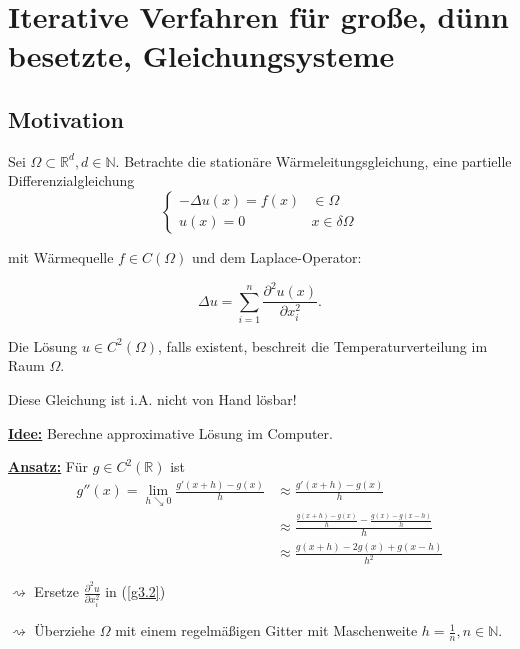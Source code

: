 \documentclass{book}
\def\R{\mathbb{R}}
\def\N{\mathbb{N}}
\begin{document}
    \chapter{Iterative Verfahren für große, dünn besetzte, Gleichungsysteme}

        \section{Motivation}

            Sei $\Omega\subset \R^d,d\in\N$. Betrachte die stationäre Wärmeleitungsgleichung, eine partielle Differenzialgleichung
            \begin{equation}\label{g3.1}
                \begin{cases}
                    -\Delta u(x)=f(x) & \in\Omega\\
                    u(x)=0 & x\in \delta\Omega
                \end{cases}
            \end{equation}

            mit Wärmequelle $f\in C(\Omega)$ und dem Laplace-Operator:

            \begin{equation}\label{g3.2}
                \Delta u =\sum_{i=1}^n \frac{\partial^2 u(x)}{\partial x_i^2}. 
            \end{equation}

            Die Lösung $u\in C^2(\Omega)$, falls existent, beschreit die Temperaturverteilung im Raum $\Omega$.

            Diese Gleichung ist i.A. nicht von Hand lösbar! 

            \underline{\textbf{Idee:}} Berechne approximative Lösung im Computer.

            \underline{\textbf{Ansatz:}} Für $g\in C^2(\R)$ ist
            \begin{align*}
                g''(x)=\lim_{h\searrow 0} \frac{g'(x+h)-g(x)}{h} &\approx \frac{g'(x+h)-g(x)}{h} \\
                & \approx \frac{\frac{g(x+h)-g(x)}{h}-\frac{g(x)-g(x-h)}{h}}{h}\\
                &\approx \frac{g(x+h)-2g(x)+g(x-h)}{h^2}
            \end{align*}

            $\rightsquigarrow$ Ersetze $\frac{\partial^2 u}{\partial x_i^2}$ in (\ref{g3.2})

            $\rightsquigarrow$ Überziehe $\Omega$ mit einem regelmäßigen Gitter mit Maschenweite $h=\frac{1}{n},n\in\N$.
\end{document}
